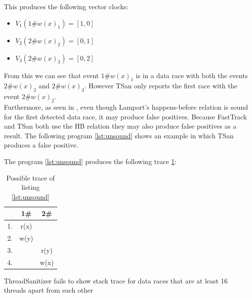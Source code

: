\documentclass[12pt]{article}
\begin{document}
	This produces the following vector clocks:
	\begin{itemize}
		\item $V_1(1\#w(x)_1) = [1,0]$
		\item $V_2(2\#w(x)_2) = [0,1]$
		\item $V_3(2\#w(x)_3) = [0,2]$
	\end{itemize}
	From this we can see that event $1\#w(x)_1$ is in a data race with both the events $2\#w(x)_2$ and $2\#w(x)_3$. However TSan only reports the first race with the event $2\#w(x)_2$.\\
	Furthermore, as seen in \cite[p. 2]{marthur}, even though Lamport's happens-before relation is sound for the first detected data race, it may produce false positives. Because FastTrack and TSan both use the HB relation they may also produce false positives as a result. The following program \ref{lst:unsound} shows an example in which TSan produces a false positive.
	
	The program \ref{lst:unsound} produces the following trace \ref{trace3}:
	\begin{table}[H]
		\begin{center}
			\begin{tabular}{ c c c}
				& 1\# & 2\# \\
				\hline
				1. & r(x) & \\
				2. & w(y) & \\
				3. & & r(y) \\
				4. & & w(x) \\
			\end{tabular}
			\caption{Possible trace of listing \ref{lst:unsound}}
			\label{trace3}
		\end{center}
	\end{table}
	
	
	ThreadSanitizer fails to show stack trace for data races that are at least 16 threads apart from each other
	
	
	
\end{document}
